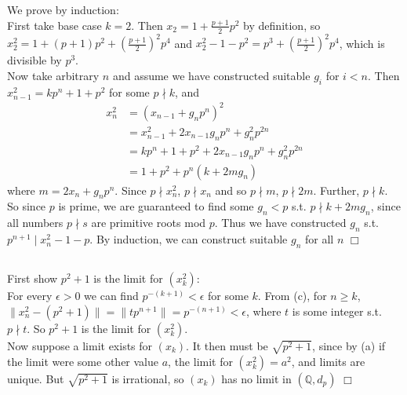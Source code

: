\documentclass{article}
\begin{document}
\subsection{}
We prove by induction:\\
First take base case $k=2$. Then $x_2 = 1+ \frac{p+1}{2}p^2$ by definition, so $x_2^2 = 1 + (p+1)p^2 + \left(\frac{p+1}{2}\right)^2p^4$ and $x_2^2 - 1 - p^2 = p^3 + \left(\frac{p+1}{2}\right)^2p^4$, which is divisible by $p^3$.\\
Now take arbitrary $n$ and assume we have constructed suitable $g_i$ for $i<n$. Then $x_{n-1}^2 = kp^n+1+p^2$ for some $p\nmid k$, and
\begin{equation*}
    \begin{split}
        x_n^2 &= (x_{n-1} + g_np^n)^2 \\
        &= x_{n-1}^2 + 2x_{n-1}g_np^n + g_n^2p^{2n} \\
        &= kp^n + 1 + p^2 + 2x_{n-1}g_np^n + g_n^2p^{2n} \\
        &= 1 + p^2 + p^n(k + 2mg_n)
    \end{split}
\end{equation*}
where $m = 2x_n + g_np^n$. Since $p \nmid x_n^2$, $p \nmid x_n$ and so $p \nmid m$, $p\nmid 2m$. Further, $p \nmid k$. So since $p$ is prime, we are guaranteed to find some $g_n < p$ s.t. $p \nmid k+2mg_n$, since all numbers $p\nmid s$ are primitive roots mod $p$. Thus we have constructed $g_n$ s.t. $p^{n+1} \mid x_n^2 - 1 -p$. By induction, we can construct suitable $g_n$ for all $n$ $\Box$

\subsection{}
First show $p^2+1$ is the limit for $(x_k^2)$:\\
For every $\epsilon>0$ we can find $p^{-(k+1)}<\epsilon$ for some $k$. From (c), for $n\geq k$, $\|x_n^2 - (p^2+1)\| = \|tp^{n+1}\| = p^{-(n+1)} < \epsilon$, where $t$ is some integer s.t. $p\nmid t$. So $p^2+1$ is the limit for $(x_k^2)$.\\
Now suppose a limit exists for $(x_k)$. It then must be $\sqrt{p^2+1}$, since by (a) if the limit were some other value $a$, the limit for $(x_k^2) = a^2$, and limits are unique. But $\sqrt{p^2+1}$ is irrational, so $(x_k)$ has no limit in $(\mathbb{Q},d_p)$ $\Box$
\end{document}
